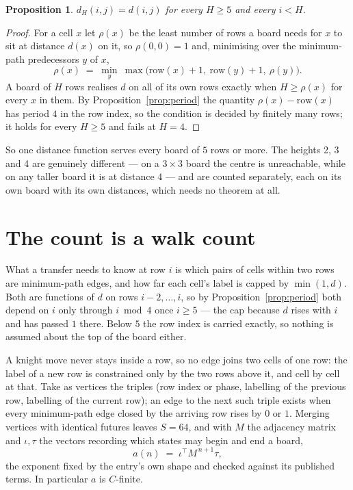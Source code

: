 \documentclass[11pt,a4paper]{article}
\theoremstyle{plain}
\newtheorem{proposition}[theorem]{Proposition}
\theoremstyle{definition}
\begin{document}
\begin{proposition}\label{prop:height}
$d_H(i,j)=d(i,j)$ for every $H\ge5$ and every $i<H$.
\end{proposition}

\begin{proof}
For a cell $x$ let $\rho(x)$ be the least number of rows a board needs for $x$ to sit at distance $d(x)$ on it, so $\rho(0,0)=1$ and, minimising over the minimum-path predecessors $y$ of $x$,
\[ \rho(x)\;=\;\min_y\ \max\bigl(\mathrm{row}(x)+1,\ \mathrm{row}(y)+1,\ \rho(y)\bigr). \]
A board of $H$ rows realises $d$ on all of its own rows exactly when $H\ge\rho(x)$ for every $x$ in them. By Proposition~\ref{prop:period} the quantity $\rho(x)-\mathrm{row}(x)$ has period $4$ in the row index, so the condition is decided by finitely many rows; it holds for every $H\ge5$ and fails at $H=4$.
\end{proof}

So one distance function serves every board of $5$ rows or more. The heights 2, 3 and 4 are genuinely different --- on a $3\times3$ board the centre is unreachable, while on any taller board it is at distance $4$ --- and are counted separately, each on its own board with its own distances, which needs no theorem at all.

\section{The count is a walk count}

What a transfer needs to know at row $i$ is which pairs of cells within two rows are minimum-path edges, and how far each cell's label is capped by $\min(1,d)$. Both are functions of $d$ on rows $i-2,\dots,i$, so by Proposition~\ref{prop:period} both depend on $i$ only through $i\bmod 4$ once $i\ge5$ --- the cap because $d$ rises with $i$ and has passed $1$ there. Below $5$ the row index is carried exactly, so nothing is assumed about the top of the board either.

A knight move never stays inside a row, so no edge joins two cells of one row: the label of a new row is constrained only by the two rows above it, and cell by cell at that. Take as vertices the triples (row index or phase, labelling of the previous row, labelling of the current row); an edge to the next such triple exists when every minimum-path edge closed by the arriving row rises by $0$ or $1$. Merging vertices with identical futures leaves $S=64$, and with $M$ the adjacency matrix and $\iota,\tau$ the vectors recording which states may begin and end a board,
\[
a(n)\;=\;\iota^{\!\top}M^{\,n+1}\tau ,
\]
the exponent fixed by the entry's own shape and checked against its published terms. In
particular $a$ is $C$-finite.
\end{document}
